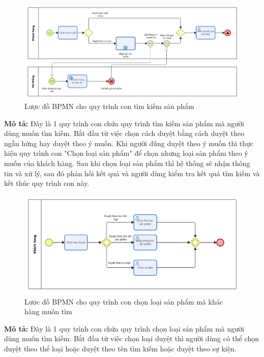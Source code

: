     \begin{figure}[!htp]
        \centering
        \includegraphics[width=13cm]{img/BPMN/customer_buy/customer_search_product.png}
        \newline
        \caption{Lược đồ BPMN cho quy trình con tìm kiếm sản phẩm}
    \end{figure}
    \textbf{Mô tả:} Đây là 1 quy trình con chứa quy trình tìm kiếm sản phẩm mà người dùng muốn tìm kiếm. Bắt đầu từ việc chọn cách duyệt bằng cách duyệt theo ngẫu hứng hay duyệt theo ý muốn. Khi người dũng duyệt theo ý muốn thì thực hiện quy trình con "Chọn loại sản phẩm" để chọn nhưng loại sản phẩm theo ý muốn của khách hàng. Sau khi chọn loại sản phẩm thì hệ thống sẽ nhận thông tin và xử lý, sau đó phản hồi kết quả và người dùng kiểm tra kết quả tìm kiếm và kết thúc quy trình con này.

    \begin{figure}[!htp]
        \centering
        \includegraphics[width=12cm]{img/BPMN/customer_buy/customer_select_type.png}
        \newline
        \caption{Lược đồ BPMN cho quy trình con chọn loại sản phẩm mà khác hàng muốn tìm}
    \end{figure}
    \textbf{Mô tả:} Đây là 1 quy trình con chứa quy trình chọn loại sản phẩm mà người dùng muốn tìm kiếm. Bắt đầu từ việc chọn loại duyệt thì người dùng có thể chọn duyệt theo thể loại hoặc duyệt theo tên tìm kiếm hoặc duyệt theo sự kiện.
    
